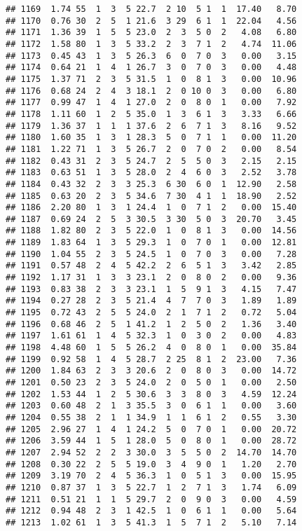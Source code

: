 \documentclass[
]{article}
\begin{document}
\begin{verbatim}
## 1169  1.74 55  1  3  5 22.7  2 10  5 1  1  17.40   8.70
## 1170  0.76 30  2  5  1 21.6  3 29  6 1  1  22.04   4.56
## 1171  1.36 39  1  5  5 23.0  2  3  5 0  2   4.08   6.80
## 1172  1.58 80  1  3  5 33.2  2  3  7 1  2   4.74  11.06
## 1173  0.45 43  1  3  5 26.3  6  0  7 0  3   0.00   3.15
## 1174  0.64 21  1  4  1 26.7  3  0  7 0  3   0.00   4.48
## 1175  1.37 71  2  3  5 31.5  1  0  8 1  3   0.00  10.96
## 1176  0.68 24  2  4  3 18.1  2  0 10 0  3   0.00   6.80
## 1177  0.99 47  1  4  1 27.0  2  0  8 0  1   0.00   7.92
## 1178  1.11 60  1  2  5 35.0  1  3  6 1  3   3.33   6.66
## 1179  1.36 37  1  1  1 37.6  2  6  7 1  3   8.16   9.52
## 1180  1.60 35  1  3  1 28.3  5  0  7 1  1   0.00  11.20
## 1181  1.22 71  1  3  5 26.7  2  0  7 0  2   0.00   8.54
## 1182  0.43 31  2  3  5 24.7  2  5  5 0  3   2.15   2.15
## 1183  0.63 51  1  3  5 28.0  2  4  6 0  3   2.52   3.78
## 1184  0.43 32  2  3  3 25.3  6 30  6 0  1  12.90   2.58
## 1185  0.63 20  2  3  5 34.6  7 30  4 1  1  18.90   2.52
## 1186  2.20 80  1  3  1 24.4  1  0  7 1  2   0.00  15.40
## 1187  0.69 24  2  5  3 30.5  3 30  5 0  3  20.70   3.45
## 1188  1.82 80  2  3  5 22.0  1  0  8 1  3   0.00  14.56
## 1189  1.83 64  1  3  5 29.3  1  0  7 0  1   0.00  12.81
## 1190  1.04 55  2  3  5 24.5  1  0  7 0  3   0.00   7.28
## 1191  0.57 48  2  4  5 42.2  2  6  5 1  3   3.42   2.85
## 1192  1.17 31  1  3  3 23.1  2  0  8 0  2   0.00   9.36
## 1193  0.83 38  2  3  3 23.1  1  5  9 1  3   4.15   7.47
## 1194  0.27 28  2  3  5 21.4  4  7  7 0  3   1.89   1.89
## 1195  0.72 43  2  5  5 24.0  2  1  7 1  2   0.72   5.04
## 1196  0.68 46  2  5  1 41.2  1  2  5 0  2   1.36   3.40
## 1197  1.61 61  1  4  5 32.3  1  0  3 0  2   0.00   4.83
## 1198  4.48 60  1  5  5 26.2  4  0  8 0  1   0.00  35.84
## 1199  0.92 58  1  4  5 28.7  2 25  8 1  2  23.00   7.36
## 1200  1.84 63  2  3  3 20.6  2  0  8 0  3   0.00  14.72
## 1201  0.50 23  2  3  5 24.0  2  0  5 0  1   0.00   2.50
## 1202  1.53 44  1  2  5 30.6  3  3  8 0  3   4.59  12.24
## 1203  0.60 48  2  1  3 35.5  3  0  6 1  1   0.00   3.60
## 1204  0.55 38  2  1  1 34.9  1  1  6 1  2   0.55   3.30
## 1205  2.96 27  1  4  1 24.2  5  0  7 0  1   0.00  20.72
## 1206  3.59 44  1  5  1 28.0  5  0  8 0  1   0.00  28.72
## 1207  2.94 52  2  2  3 30.0  3  5  5 0  2  14.70  14.70
## 1208  0.30 22  2  5  5 19.0  3  4  9 0  1   1.20   2.70
## 1209  3.19 70  2  4  5 36.3  1  0  5 1  3   0.00  15.95
## 1210  0.87 37  1  3  5 22.7  1  2  7 1  3   1.74   6.09
## 1211  0.51 21  1  1  5 29.7  2  0  9 0  3   0.00   4.59
## 1212  0.94 48  2  3  1 42.5  1  0  6 1  1   0.00   5.64
## 1213  1.02 61  1  3  5 41.3  1  5  7 1  2   5.10   7.14

\end{verbatim}
\end{document}
